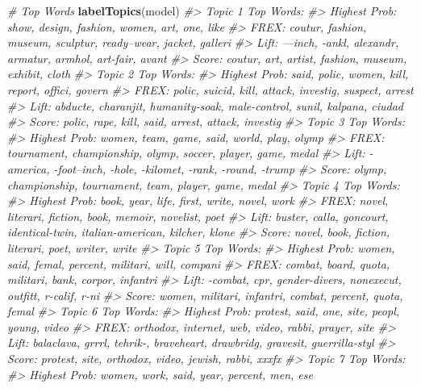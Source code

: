 \documentclass[
]{book}
\newenvironment{Shaded}{\begin{snugshade}}{\end{snugshade}}
\newcommand{\CommentTok}[1]{\textcolor[rgb]{0.56,0.35,0.01}{\textit{#1}}}
\newcommand{\KeywordTok}[1]{\textcolor[rgb]{0.13,0.29,0.53}{\textbf{#1}}}
\newcommand{\NormalTok}[1]{#1}
\begin{document}
\begin{Shaded}
\begin{Highlighting}[]
\CommentTok{# Top Words}
\KeywordTok{labelTopics}\NormalTok{(model)}
\CommentTok{#> Topic 1 Top Words:}
\CommentTok{#>       Highest Prob: show, design, fashion, women, art, one, like }
\CommentTok{#>       FREX: coutur, fashion, museum, sculptur, ready--wear, jacket, galleri }
\CommentTok{#>       Lift: ---inch, -ankl, alexandr, armatur, armhol, art-fair, avant }
\CommentTok{#>       Score: coutur, art, artist, fashion, museum, exhibit, cloth }
\CommentTok{#> Topic 2 Top Words:}
\CommentTok{#>       Highest Prob: said, polic, women, kill, report, offici, govern }
\CommentTok{#>       FREX: polic, suicid, kill, attack, investig, suspect, arrest }
\CommentTok{#>       Lift: abducte, charanjit, humanity-soak, male-control, sunil, kalpana, ciudad }
\CommentTok{#>       Score: polic, rape, kill, said, arrest, attack, investig }
\CommentTok{#> Topic 3 Top Words:}
\CommentTok{#>       Highest Prob: women, team, game, said, world, play, olymp }
\CommentTok{#>       FREX: tournament, championship, olymp, soccer, player, game, medal }
\CommentTok{#>       Lift: -america, -foot--inch, -hole, -kilomet, -rank, -round, -trump }
\CommentTok{#>       Score: olymp, championship, tournament, team, player, game, medal }
\CommentTok{#> Topic 4 Top Words:}
\CommentTok{#>       Highest Prob: book, year, life, first, write, novel, work }
\CommentTok{#>       FREX: novel, literari, fiction, book, memoir, novelist, poet }
\CommentTok{#>       Lift: buster, calla, goncourt, identical-twin, italian-american, kilcher, klone }
\CommentTok{#>       Score: novel, book, fiction, literari, poet, writer, write }
\CommentTok{#> Topic 5 Top Words:}
\CommentTok{#>       Highest Prob: women, said, femal, percent, militari, will, compani }
\CommentTok{#>       FREX: combat, board, quota, militari, bank, corpor, infantri }
\CommentTok{#>       Lift: -combat, cpr, gender-divers, nonexecut, outfitt, r-calif, r-ni }
\CommentTok{#>       Score: women, militari, infantri, combat, percent, quota, femal }
\CommentTok{#> Topic 6 Top Words:}
\CommentTok{#>       Highest Prob: protest, said, one, site, peopl, young, video }
\CommentTok{#>       FREX: orthodox, internet, web, video, rabbi, prayer, site }
\CommentTok{#>       Lift: balaclava, grrrl, tehrik-, braveheart, drawbridg, gravesit, guerrilla-styl }
\CommentTok{#>       Score: protest, site, orthodox, video, jewish, rabbi, xxxfx }
\CommentTok{#> Topic 7 Top Words:}
\CommentTok{#>       Highest Prob: women, work, said, year, percent, men, ese }

\end{Highlighting}
\end{Shaded}
\end{document}
